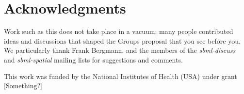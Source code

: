 
\section{Acknowledgments}

Work such as this does not take place in a vacuum; many people contributed ideas and discussions that shaped the Groups proposal that you see before you.  We particularly thank Frank Bergmann, and the members of the \emph{sbml-discuss} and \emph{sbml-spatial} mailing lists for suggestions and comments.

This work was funded by the National Institutes of Health (USA) under grant [Something?]
